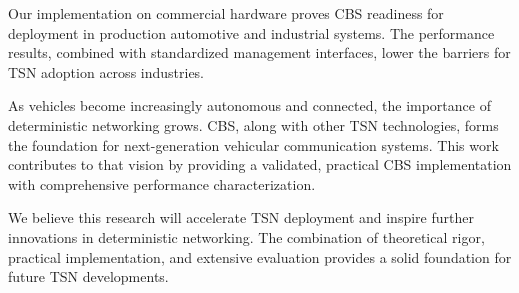 \documentclass[10pt, journal, compsoc]{IEEEtran}
\begin{document}
Our implementation on commercial hardware proves CBS readiness for deployment in production automotive and industrial systems. The performance results, combined with standardized management interfaces, lower the barriers for TSN adoption across industries.

As vehicles become increasingly autonomous and connected, the importance of deterministic networking grows. CBS, along with other TSN technologies, forms the foundation for next-generation vehicular communication systems. This work contributes to that vision by providing a validated, practical CBS implementation with comprehensive performance characterization.

We believe this research will accelerate TSN deployment and inspire further innovations in deterministic networking. The combination of theoretical rigor, practical implementation, and extensive evaluation provides a solid foundation for future TSN developments.
\end{document}
